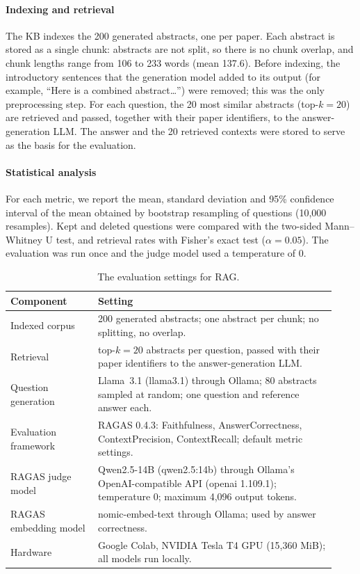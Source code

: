 \documentclass[bdcc,article,submit,pdftex,moreauthors]{Definitions/mdpi}
\newcommand{\commentVP}[1]{\textcolor{orange}{\textbf{VP:} #1}}
\begin{document}
\paragraph{Indexing and retrieval}
The KB indexes the 200 generated abstracts, one per paper. Each abstract is stored as a single chunk: abstracts are not split, so there is no chunk overlap, and chunk lengths range from 106 to 233 words (mean 137.6). Before indexing, the introductory sentences that the generation model added to its output (for example, ``Here is a combined abstract\ldots'') were removed; this was the only preprocessing step. For each question, the 20 most similar abstracts (top-$k = 20$) are retrieved and passed, together with their paper identifiers, to the answer-generation LLM. 
The answer and the 20 retrieved contexts were stored to serve as the basis for the evaluation.

\paragraph{Statistical analysis}
For each metric, we report the mean, standard deviation and 95\% confidence interval of the mean obtained by bootstrap resampling of questions (10{,}000 resamples).
Kept and deleted questions were compared with the two-sided Mann--Whitney U test, and retrieval rates with Fisher's exact test ($\alpha = 0.05$). The evaluation was run once and the judge model used a temperature of 0.

\begin{table}[H]
\centering
\caption{The evaluation settings for RAG.}
\label{tab:rag_eval_setup}
\renewcommand{\arraystretch}{1.2}
\footnotesize
\begin{tabular}{p{0.25\linewidth} p{0.68\linewidth}}
\toprule
\textbf{Component} & \textbf{Setting} \\
\midrule
Indexed corpus & 200 generated abstracts; one abstract per chunk; no splitting, no overlap. \\
\midrule
Retrieval & top-$k = 20$ abstracts per question, passed with their paper identifiers to the answer-generation LLM. \\
\midrule
Question generation & Llama~3.1 (llama3.1) through Ollama; 80 abstracts sampled at random; one question and reference answer each. \\
\midrule
Evaluation framework & RAGAS 0.4.3: Faithfulness, AnswerCorrectness, ContextPrecision, ContextRecall; default metric settings. \\
\midrule
RAGAS judge model & Qwen2.5-14B (qwen2.5:14b) through Ollama's OpenAI-compatible API (openai 1.109.1); temperature 0; maximum 4{,}096 output tokens. \\
\midrule
RAGAS embedding model & nomic-embed-text through Ollama; used by answer correctness. \\
\midrule
Hardware & Google Colab, NVIDIA Tesla T4 GPU (15{,}360 MiB); all models run locally. \\
\bottomrule
\end{tabular}
\end{table}
\end{document}
